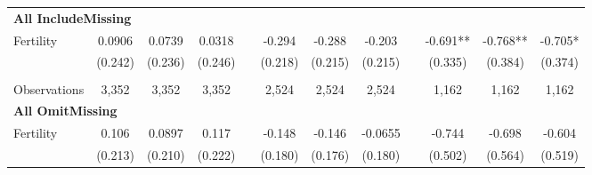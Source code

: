\begin{landscape}
\begin{table}[htpb!]
\begin{center}
\begin{tabular}{lcccp{2mm}cccp{2mm}ccc}
\multicolumn{12}{l}{\textbf{All IncludeMissing}}\\ 
Fertility&0.0906&0.0739&0.0318&&-0.294&-0.288&-0.203&&-0.691**&-0.768**&-0.705*\\
&(0.242)&(0.236)&(0.246)&&(0.218)&(0.215)&(0.215)&&(0.335)&(0.384)&(0.374)\\
\begin{footnotesize}\end{footnotesize}&\begin{footnotesize}\end{footnotesize}&\begin{footnotesize}\end{footnotesize}&\begin{footnotesize}\end{footnotesize}&\begin{footnotesize}\end{footnotesize}&\begin{footnotesize}\end{footnotesize}&\begin{footnotesize}\end{footnotesize}&\begin{footnotesize}\end{footnotesize}&\begin{footnotesize}\end{footnotesize}&\begin{footnotesize}\end{footnotesize}&\begin{footnotesize}\end{footnotesize}&\begin{footnotesize}\end{footnotesize}\\Observations&3,352&3,352&3,352&&2,524&2,524&2,524&&1,162&1,162&1,162\\
\multicolumn{12}{l}{\textbf{All OmitMissing}}\\ 
Fertility&0.106&0.0897&0.117&&-0.148&-0.146&-0.0655&&-0.744&-0.698&-0.604\\
&(0.213)&(0.210)&(0.222)&&(0.180)&(0.176)&(0.180)&&(0.502)&(0.564)&(0.519)\\

\end{tabular}
\end{center}
\end{table}
\end{landscape}
